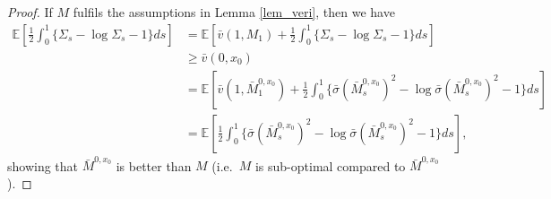 \documentclass[reqno, a4paper]{amsart}
\theoremstyle{remark}
\newcommand{\1}{\mathbbm 1}
\numberwithin{equation}{section}
\numberwithin{theorem}{section}
\newcommand{\mo}{\bar{M}}
\newcommand{\vo}{\bar{v}}
\newcommand{\so}{\bar{\sigma}}
\begin{document}
\begin{proof}
If $M$ fulfils the assumptions in Lemma	 \ref{lem_veri},
	then we have
	\begin{align*}
	\mathbb E\left [
\frac{1}{2}\int_0^1\{\Sigma_s-\log\Sigma_s-1\}ds	\right ] &=
	\mathbb E\left [
\vo(1,M_1)+\frac{1}{2}\int_0^1\{\Sigma_s-\log\Sigma_s-1\}ds	\right ]\\
&\geq 	\vo(0,x_0) \\
&= 	\mathbb E\left [
\vo(1,\mo^{0,x_0}_1)+\frac{1}{2}\int_0^1\{\so(\mo^{0,x_0}_s)^2-\log\so(\mo^{0,x_0}_s)^2-1\}ds	\right ]\\
&= \mathbb E\left [
\frac{1}{2}\int_0^1\{\so(\mo^{0,x_0}_s)^2-\log\so(\mo^{0,x_0}_s)^2-1\}ds	\right ],
	\end{align*}
showing that $\mo^{0,x_0}$ is better than $M$ (i.e.\ $M$ is sub-optimal compared to $\mo^{0,x_0}$). 


\end{proof}
\end{document}
